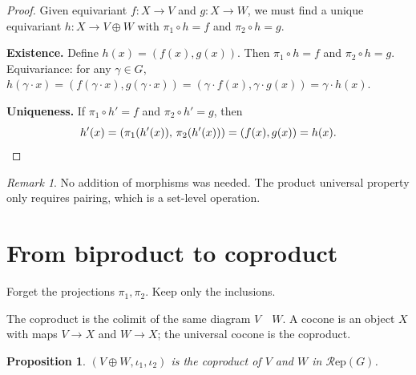 \documentclass[12pt,a4paper]{article}
\newtheorem{proposition}[theorem]{Proposition}
\theoremstyle{definition}
\theoremstyle{remark}
\newtheorem{remark}[theorem]{Remark}
\newcommand{\Rep}{\mathcal{R}\mathrm{ep}}
\begin{document}
\begin{proof}
Given equivariant $f\colon X \to V$ and $g\colon X \to W$, we must find a unique
equivariant $h\colon X \to V \oplus W$ with $\pi_1 \circ h = f$ and
$\pi_2 \circ h = g$.

\medskip
\begin{center}
\end{center}

\textbf{Existence.} Define $h(x) = (f(x), g(x))$. Then $\pi_1 \circ h = f$ and
$\pi_2 \circ h = g$. Equivariance: for any $\gamma \in G$,
$h(\gamma \cdot x) = (f(\gamma \cdot x), g(\gamma \cdot x))
= (\gamma \cdot f(x), \gamma \cdot g(x)) = \gamma \cdot h(x)$.

\textbf{Uniqueness.} If $\pi_1 \circ h' = f$ and $\pi_2 \circ h' = g$, then
\[
h'(x) = (\pi_1(h'(x)),\, \pi_2(h'(x))) = (f(x), g(x)) = h(x). \qedhere
\]
\end{proof}

\begin{remark}
No addition of morphisms was needed. The product universal property only requires
pairing, which is a set-level operation.
\end{remark}

\section{From biproduct to coproduct}

Forget the projections $\pi_1, \pi_2$. Keep only the inclusions.

The coproduct is the colimit of the same diagram $V \quad W$. A cocone is an object $X$
with maps $V \to X$ and $W \to X$; the universal cocone is the coproduct.

\begin{proposition}
$(V \oplus W, \iota_1, \iota_2)$ is the coproduct of $V$ and $W$ in $\Rep(G)$.
\end{proposition}
\end{document}
